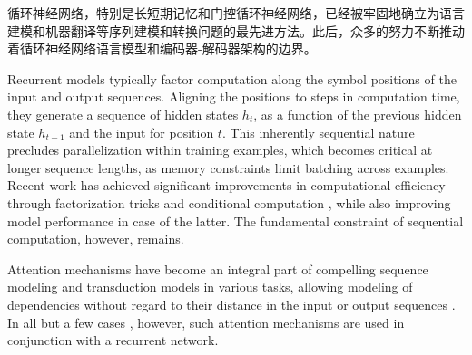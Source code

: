
循环神经网络，特别是长短期记忆\citep{hochreiter1997}和门控循环\citep{gruEval14}神经网络，已经被牢固地确立为语言建模和机器翻译等序列建模和转换问题的最先进方法\citep{sutskever14, bahdanau2014neural, cho2014learning}。此后，众多的努力不断推动着循环神经网络语言模型和编码器-解码器架构的边界\citep{wu2016google,luong2015effective,jozefowicz2016exploring}。

Recurrent models typically factor computation along the symbol positions of the input and output sequences. Aligning the positions to steps in computation time, they generate a sequence of hidden states $h_t$, as a function of the previous hidden state $h_{t-1}$ and the input for position $t$. This inherently sequential nature precludes parallelization within training examples, which becomes critical at longer sequence lengths, as memory constraints limit batching across examples.
Recent work has achieved significant improvements in computational efficiency through factorization tricks \citep{Kuchaiev2017Factorization} and conditional computation \citep{shazeer2017outrageously}, while also improving model performance in case of the latter. The fundamental constraint of sequential computation, however, remains.


Attention mechanisms have become an integral part of compelling sequence modeling and transduction models in various tasks, allowing modeling of dependencies without regard to their distance in the input or output sequences \citep{bahdanau2014neural, structuredAttentionNetworks}. In all but a few cases \citep{decomposableAttnModel}, however, such attention mechanisms are used in conjunction with a recurrent network.


